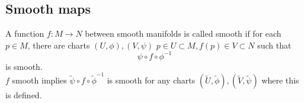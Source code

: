 \documentclass[../main.tex]{subfiles}
\begin{document}
\subsection{Smooth maps}
A function $f:M\to N$ between smooth manifolds is called smooth if for each $p \in M$, there are charts $( U,\phi), ( V,\psi) $  $p\in U \subset M, f( p) \in V\subset N$ such that 
\[ 
\psi\circ f \circ\phi^{-1}
\]
is smooth.\\

$f$ smooth implies $\tilde\psi\circ f \circ \tilde\phi^{-1}$ is smooth for any charts $( \tilde U, \tilde\phi) ,( \tilde V,\tilde\psi) $ where this is defined.
\end{document}

